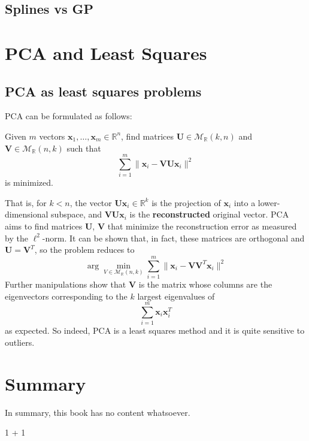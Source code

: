 \documentclass[
  letterpaper,
  DIV=11,
  numbers=noendperiod]{scrreprt}
\newenvironment{Shaded}{\begin{snugshade}}{\end{snugshade}}
\newcommand{\DecValTok}[1]{\textcolor[rgb]{0.68,0.00,0.00}{#1}}
\newcommand{\SpecialCharTok}[1]{\textcolor[rgb]{0.37,0.37,0.37}{#1}}
\theoremstyle{definition}
\theoremstyle{plain}
\theoremstyle{definition}
\theoremstyle{definition}
\theoremstyle{remark}
\begin{document}
\section{Splines vs GP}\label{splines-vs-gp}

\chapter{PCA and Least Squares}\label{pca-and-least-squares}

\section{PCA as least squares
problems}\label{pca-as-least-squares-problems}

PCA can be formulated as follows:

Given \(m\) vectors \(\pmb{x}_1, \ldots, \pmb{x}_m \in \mathbb{R}^n\),
find matrices \(\pmb{U} \in \mathcal{M}_{\mathbb{R}} (k,n)\) and
\(\pmb{V} \in \mathcal{M}_{\mathbb{R}}(n,k)\) such that \[
\sum_{i=1}^m \| \pmb{x}_i - \pmb{V}\pmb{U}\pmb{x}_i\|^2
\] is minimized.

That is, for \(k<n\), the vector \(\pmb{U}\pmb{x}_i \in \mathbb{R}^k\)
is the projection of \(\pmb{x}_i\) into a lower-dimensional subspace,
and \(\pmb{V}\pmb{U}\pmb{x}_i\) is the \textbf{reconstructed} original
vector. PCA aims to find matrices \(\pmb{U}\), \(\pmb{V}\) that minimize
the reconstruction error as measured by the \(\ell^2\)-norm. It can be
shown that, in fact, these matrices are orthogonal and
\(\pmb{U} = \pmb{V}^T\), so the problem reduces to \[
\arg\min_{V\in \mathcal{M}_{\mathbb{R}}(n,k)}\sum_{i=1}^m \| \pmb{x}_i - \pmb{V}\pmb{V}^T \pmb{x}_i \|^2
\] Further manipulations show that \(\pmb{V}\) is the matrix whose
columns are the eigenvectors corresponding to the \(k\) largest
eigenvalues of \[
\sum_{i=1}^m \pmb{x}_i \pmb{x}_i^T
\] as expected. So indeed, PCA is a least squares method and it is quite
sensitive to outliers.


\chapter{Summary}\label{summary}

In summary, this book has no content whatsoever.

\begin{Shaded}
\begin{Highlighting}[]
\DecValTok{1} \SpecialCharTok{+} \DecValTok{1}
\end{Highlighting}
\end{Shaded}
\end{document}
